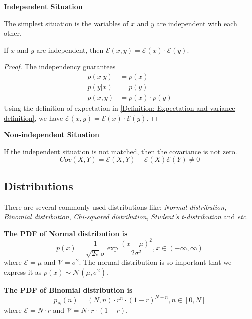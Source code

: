 \documentclass[../main.tex]{subfiles}
\begin{document}
\bigbreak
\textbf{Independent Situation}

The simplest situation is the variables of $x$ and $y$ are independent with each other.
\begin{lemma}
    \label{Lemma: Confusing second-order moment of independent variables}
    If $x$ and $y$ are independent, then $\mathcal{E}(x, y) = \mathcal{E}(x) \cdot \mathcal{E}(y)$.
    \begin{proof}
        The independency guarantees
        \begin{align*}
            p(x|y)  & = p(x)            \\
            p(y|x)  & = p(y)            \\
            p(x, y) & = p(x) \cdot p(y)
        \end{align*}
        Using the definition of expectation in \eqref{Definition: Expectation and variance definition},
        we have $\mathcal{E}(x, y) = \mathcal{E}(x) \cdot \mathcal{E}(y)$.
    \end{proof}
\end{lemma}

\bigbreak
\textbf{Non-independent Situation}

If the independent situation is not matched, then the covariance is not zero.
\begin{equation*}
    Cov(X, Y) =
    \mathcal{E}(X, Y) - \mathcal{E}(X)\mathcal{E}(Y)
    \neq 0
\end{equation*}

\subsection{Distributions}
There are several commonly used distributions like: \emph{Normal distribution}, \emph{Binomial distribution}, \emph{Chi-squared distribution}, \emph{Student's t-distribution} and \textit{etc}.

\bigbreak
\textbf{The PDF of Normal distribution is}
\begin{equation}
    \label{Definition: PDF of Normal distribution}
    p(x)=
    \frac{1}{\sqrt{2\pi}\sigma} \exp{\frac{(x-\mu)^2}{2\sigma^2}},
    x \in (-\infty, \infty)
\end{equation}
where $\mathcal{E}=\mu$ and $\mathcal{V}=\sigma^2$.
The normal distribution is so important that we express it as $p(x) \sim \mathcal{N}(\mu, \sigma^2)$.

\bigbreak
\textbf{The PDF of Binomial distribution is}
\begin{equation}
    \label{Definition: PDF of Binomial distribution}
    p_N(n)=
    (N, n) \cdot r^n \cdot (1-r)^{N-n},
    n \in [0, N]
\end{equation}
where $\mathcal{E}=N \cdot r$ and $\mathcal{V}=N \cdot r \cdot (1-r)$.
\end{document}
